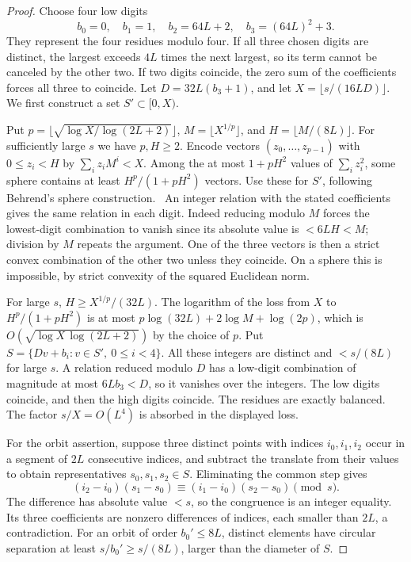 \documentclass[a4paper,11pt]{article}
\theoremstyle{definition}
\theoremstyle{remark}
\numberwithin{equation}{section}
\begin{document}
\begin{proof}
Choose four low digits
\[
 b_0=0,\quad b_1=1,\quad b_2=64L+2,\quad b_3=(64L)^2+3 .
\]
They represent the four residues modulo four. If all three chosen
digits are distinct, the largest exceeds \(4L\) times the next
largest, so its term cannot be canceled by the other two. If two
digits coincide, the zero sum of the coefficients forces all three to
coincide. Let \(D=32L(b_3+1)\), and let \(X=\lfloor s/(16LD)\rfloor\).
We first construct a set \(S'\subset[0,X)\).

Put \(p=\lfloor\sqrt{\log X/\log(2L+2)}\rfloor\),
\(M=\lfloor X^{1/p}\rfloor\), and \(H=\lfloor M/(8L)\rfloor\).
For sufficiently large \(s\) we have \(p,H\ge2\). Encode vectors
\((z_0,\ldots,z_{p-1})\) with \(0\le z_i<H\) by
\(\sum_i z_i M^i<X\). Among the at most \(1+pH^2\) values of
\(\sum_i z_i^2\), some sphere contains at least \(H^p/(1+pH^2)\)
vectors. Use these for \(S'\), following Behrend's sphere
construction.~\cite{I-I-I-behrend48}
An integer relation with the stated coefficients gives the same
relation in each digit. Indeed reducing modulo \(M\) forces the
lowest-digit combination to vanish since its absolute value is
\(<6LH<M\); division by \(M\) repeats the argument. One of the three
vectors is then a strict convex combination of the other two unless
they coincide. On a sphere this is impossible, by strict convexity
of the squared Euclidean norm.

For large \(s\), \(H\ge X^{1/p}/(32L)\). The logarithm of the loss
from \(X\) to \(H^p/(1+pH^2)\) is at most
\(p\log(32L)+2\log M+\log(2p)\), which is
\(O(\sqrt{\log X\,\log(2L+2)})\) by the choice of \(p\).
Put \(S=\{Dv+b_i:v\in S',\ 0\le i<4\}\). All these integers are
distinct and \(<s/(8L)\) for large \(s\). A relation reduced modulo
\(D\) has a low-digit combination of magnitude at most \(6Lb_3<D\),
so it vanishes over the integers. The low digits coincide, and then
the high digits coincide. The residues are exactly balanced.
The factor \(s/X=O(L^4)\) is absorbed in the displayed loss.

For the orbit assertion, suppose three distinct points with indices
\(i_0,i_1,i_2\) occur in a segment of \(2L\) consecutive indices,
and subtract the translate from their values to obtain representatives
\(s_0,s_1,s_2\in S\). Eliminating the common step gives
\[
 (i_2-i_0)(s_1-s_0)\equiv(i_1-i_0)(s_2-s_0)\pmod{s}.
\]
The difference has absolute value \(<s\), so the congruence is an
integer equality. Its three coefficients are nonzero differences
of indices, each smaller than \(2L\), a contradiction. For an orbit
of order \(b_0'\le8L\), distinct elements have circular separation
at least \(s/b_0'\ge s/(8L)\), larger than the diameter of \(S\).
\end{proof}
\end{document}
